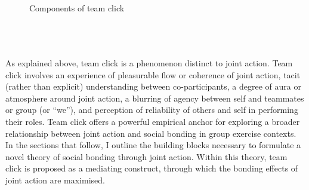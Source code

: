 \begin{CJK}{UTF8}{gbsn}
        \begin{figure}
          \noindent{}
              \\
          \caption{Components of team click}
          \label{fig:clickComponents}
        \end{figure}


    \\
    \\
    \\
  As explained above, team click is a phenomenon distinct to joint action.  Team click involves an experience of pleasurable flow or coherence of joint action, tacit (rather than explicit) understanding between co-participants, a degree of aura or atmosphere around joint action, a blurring of agency between self and teammates or group (or ``we''), and perception of reliability of others and self in performing their roles.  Team click offers a powerful empirical anchor for exploring a broader relationship between joint action and social bonding in group exercise contexts.  In the sections that follow, I outline the building blocks necessary to formulate a novel theory of social bonding through joint action.  Within this theory, team click is proposed as a mediating construct, through which the bonding effects of joint action are maximised.


\end{CJK}
